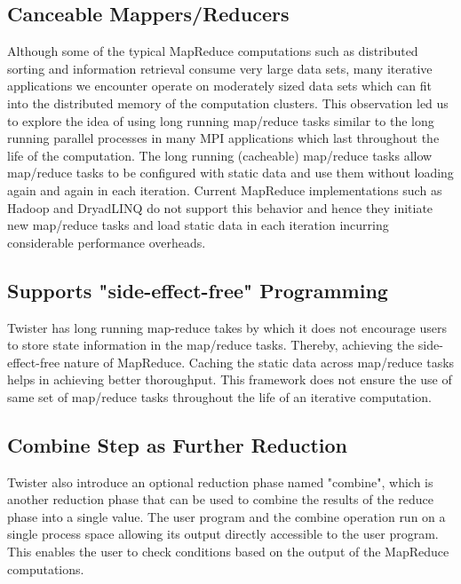\documentclass[9pt,twocolumn,twoside]{styles/osajnl}
\begin{document}
\subsection{Canceable Mappers/Reducers}
Although some of the typical MapReduce computations such as
distributed sorting and information retrieval consume very large data
sets, many iterative applications we encounter operate on moderately
sized data sets which can fit into the distributed memory of the
computation clusters\cite{elsayed2014mapreduce}. This observation led
us to explore the idea of using long running map/reduce tasks similar
to the long running parallel processes in many MPI applications which
last throughout the life of the computation. The long running
(cacheable) map/reduce tasks allow map/reduce tasks to be configured
with static data and use them without loading again and again in each
iteration\cite{lee2012parallel}. Current MapReduce implementations
such as Hadoop and DryadLINQ do not support this behavior and hence
they initiate new map/reduce tasks and load static data in each
iteration incurring considerable performance overheads\cite{twister}.

\subsection{Supports "side-effect-free" Programming}
Twister has long running map-reduce takes by which it does not
encourage users to store state information in the map/reduce
tasks. Thereby, achieving the side-effect-free nature of
MapReduce. Caching the static data across map/reduce tasks helps in
achieving better thoroughput\cite{lee2012parallel}. This framework
does not ensure the use of same set of map/reduce tasks throughout the
life of an iterative computation\cite{twister}.

\subsection{Combine Step as Further Reduction}
Twister also introduce an optional reduction phase named "combine",
which is another reduction phase that can be used to combine the
results of the reduce phase into a single value. The user program and
the combine operation run on a single process space allowing its
output directly accessible to the user
program\cite{grolinger2014challenges}. This enables the user to check
conditions based on the output of the MapReduce
computations\cite{twister}.
\end{document}
